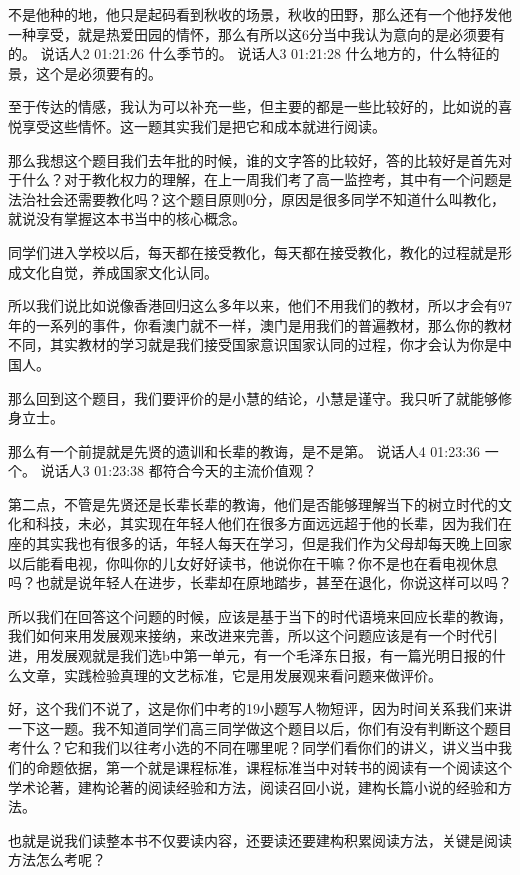 \documentclass{ctexart}
\renewcommand{\\}{\par}
\begin{document}
不是他种的地，他只是起码看到秋收的场景，秋收的田野，那么还有一个他抒发他一种享受，就是热爱田园的情怀，那么有所以这6分当中我认为意向的是必须要有的。
说话人2 01:21:26
什么季节的。
说话人3 01:21:28
什么地方的，什么特征的景，这个是必须要有的。

至于传达的情感，我认为可以补充一些，但主要的都是一些比较好的，比如说的喜悦享受这些情怀。这一题其实我们是把它和成本就进行阅读。

那么我想这个题目我们去年批的时候，谁的文字答的比较好，答的比较好是首先对于什么？对于教化权力的理解，在上一周我们考了高一监控考，其中有一个问题是法治社会还需要教化吗？这个题目原则0分，原因是很多同学不知道什么叫教化，就说没有掌握这本书当中的核心概念。

同学们进入学校以后，每天都在接受教化，每天都在接受教化，教化的过程就是形成文化自觉，养成国家文化认同。

所以我们说比如说像香港回归这么多年以来，他们不用我们的教材，所以才会有97年的一系列的事件，你看澳门就不一样，澳门是用我们的普遍教材，那么你的教材不同，其实教材的学习就是我们接受国家意识国家认同的过程，你才会认为你是中国人。

那么回到这个题目，我们要评价的是小慧的结论，小慧是谨守。我只听了就能够修身立士。

那么有一个前提就是先贤的遗训和长辈的教诲，是不是第。
说话人4 01:23:36
一个。
说话人3 01:23:38
都符合今天的主流价值观？

第二点，不管是先贤还是长辈长辈的教诲，他们是否能够理解当下的树立时代的文化和科技，未必，其实现在年轻人他们在很多方面远远超于他的长辈，因为我们在座的其实我也有很多的话，年轻人每天在学习，但是我们作为父母却每天晚上回家以后能看电视，你叫你的儿女好好读书，他说你在干嘛？你不是也在看电视休息吗？也就是说年轻人在进步，长辈却在原地踏步，甚至在退化，你说这样可以吗？

所以我们在回答这个问题的时候，应该是基于当下的时代语境来回应长辈的教诲，我们如何来用发展观来接纳，来改进来完善，所以这个问题应该是有一个时代引进，用发展观就是我们选b中第一单元，有一个毛泽东日报，有一篇光明日报的什么文章，实践检验真理的文艺标准，它是用发展观来看问题来做评价。

好，这个我们不说了，这是你们中考的19小题写人物短评，因为时间关系我们来讲一下这一题。我不知道同学们高三同学做这个题目以后，你们有没有判断这个题目考什么？它和我们以往考小选的不同在哪里呢？同学们看你们的讲义，讲义当中我们的命题依据，第一个就是课程标准，课程标准当中对转书的阅读有一个阅读这个学术论著，建构论著的阅读经验和方法，阅读召回小说，建构长篇小说的经验和方法。

也就是说我们读整本书不仅要读内容，还要读还要建构积累阅读方法，关键是阅读方法怎么考呢？
\end{document}
